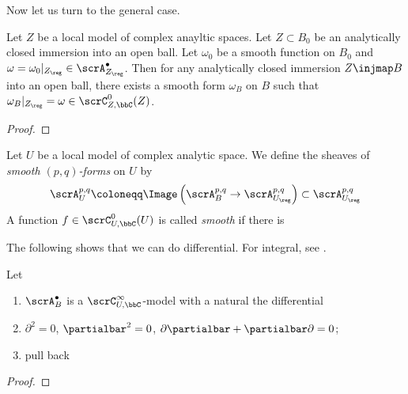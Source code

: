 Now let us turn to the general case.

\begin{lemma}
	Let $Z$ be a local model of complex anayltic spaces.
	Let $Z \subset B_0$ be an analytically closed immersion into an open ball.
	Let $\omega_0$ be a smooth function on $B_0$ and $\omega = \omega_0|_{Z_\reg} \in \scrA^\bullet_{Z_\reg}$.
	Then for any analytically closed immersion $Z \injmap B$ into an open ball, there exists a smooth form $\omega_B$ on $B$ such that $\omega_B|_{Z_\reg} = \omega \in \scrC_{Z,\bbC}^0(Z)$.
\end{lemma}
\begin{proof}
	\Yang{}
\end{proof}


\begin{definition}
	Let $U$ be a local model of complex analytic space.
	We define the sheaves of \emph{smooth $(p,q)$-forms} on $U$ by
	\[ \scrA^{p,q}_U \coloneqq \Image \left( \scrA^{p,q}_B \to \scrA^{p,q}_{U_\reg} \right) \subset \scrA_{U_\reg}^{p,q} \]
	A function $f \in \scrC^0_{U,\bbC}(U)$ is called \emph{smooth} if there is
	\Yang{}
\end{definition}

The following shows that we can do differential.
For integral, see \Yang{}.

\begin{proposition}
	Let
	\begin{enumerate}
		\item $\scrA_B^\bullet$ is a $\scrC_{U,\bbC}^\infty$-model with a natural  the differential
		\item $\partial^2 = 0$, $\partialbar^2 = 0$, $\partial \partialbar + \partialbar \partial = 0$;
		\item pull back
	\end{enumerate}
	\Yang{}
\end{proposition}
\begin{proof}
	\Yang{}
\end{proof}






\Yang{}

